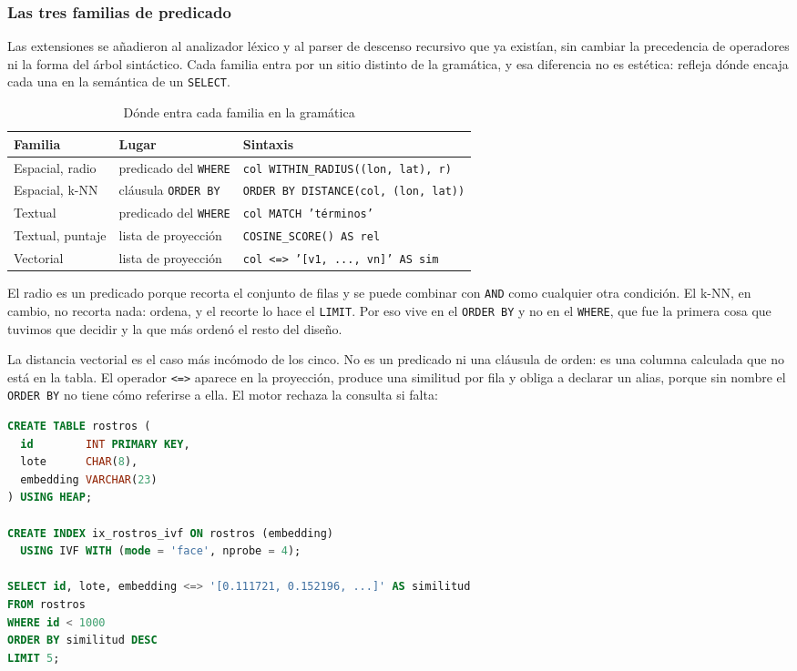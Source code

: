 \subsubsection{Las tres familias de predicado}

Las extensiones se añadieron al analizador léxico y al parser de descenso
recursivo que ya existían, sin cambiar la precedencia de operadores ni la forma
del árbol sintáctico. Cada familia entra por un sitio distinto de la gramática,
y esa diferencia no es estética: refleja dónde encaja cada una en la semántica
de un \texttt{SELECT}.

\begin{table}[H]
\centering
\caption{Dónde entra cada familia en la gramática}
\begin{tabularx}{\textwidth}{@{}llX@{}}
\toprule
\textbf{Familia} & \textbf{Lugar} & \textbf{Sintaxis} \\
\midrule
Espacial, radio & predicado del \texttt{WHERE} & \texttt{col WITHIN\_RADIUS((lon, lat), r)} \\
Espacial, k-NN & cláusula \texttt{ORDER BY} & \texttt{ORDER BY DISTANCE(col, (lon, lat))} \\
Textual & predicado del \texttt{WHERE} & \texttt{col MATCH 'términos'} \\
Textual, puntaje & lista de proyección & \texttt{COSINE\_SCORE() AS rel} \\
Vectorial & lista de proyección & \texttt{col \textless=\textgreater{} '[v1, ..., vn]' AS sim} \\
\bottomrule
\end{tabularx}
\end{table}

El radio es un predicado porque recorta el conjunto de filas y se puede combinar
con \texttt{AND} como cualquier otra condición. El k-NN, en cambio, no recorta
nada: ordena, y el recorte lo hace el \texttt{LIMIT}. Por eso vive en el
\texttt{ORDER BY} y no en el \texttt{WHERE}, que fue la primera cosa que tuvimos
que decidir y la que más ordenó el resto del diseño.

La distancia vectorial es el caso más incómodo de los cinco. No es un predicado
ni una cláusula de orden: es una columna calculada que no está en la tabla. El
operador \texttt{\textless=\textgreater{}} aparece en la proyección, produce una similitud por fila y
obliga a declarar un alias, porque sin nombre el \texttt{ORDER BY} no tiene cómo
referirse a ella. El motor rechaza la consulta si falta:

\begin{lstlisting}[language=SQL, caption={Declaración y uso del índice vectorial}]
CREATE TABLE rostros (
  id        INT PRIMARY KEY,
  lote      CHAR(8),
  embedding VARCHAR(23)
) USING HEAP;

CREATE INDEX ix_rostros_ivf ON rostros (embedding)
  USING IVF WITH (mode = 'face', nprobe = 4);

SELECT id, lote, embedding <=> '[0.111721, 0.152196, ...]' AS similitud
FROM rostros
WHERE id < 1000
ORDER BY similitud DESC
LIMIT 5;
\end{lstlisting}

